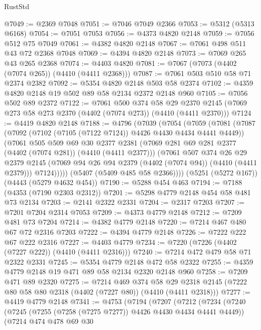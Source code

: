 \begin{lexlean}{RustStd}
\begin{coremodule}
@7049 := @2369 @7048
@7051 := @7046 @7049 @2366
@7053 := @5312 (@5313 @6168)
@7054 := @7051 @7053
@7056 := @4373 @4820 @2148
@7059 := @7056 @512 @75 @7049
@7061 := @4382 @4820 @2148
@7067 := @7061 @498 @511 @43 @72 @2368 @7048
@7069 := @4394 @4820 @2148
@7073 := @7069 @265 @43 @265 @2368
@7074 := @4403 @4820
@7081 := @7067 (@7073 (@4402 (@7074 @265)) (@4410 (@4411 @2368)))
@7087 := @7061 @503 @510 @58 @71 @2374 @2382
@7092 := @5354 @4820 @2148 @503 @58 @2374
@7102 := @4359 @4820 @2148 @19 @502 @89 @58 @2134 @2372 @2148 @960
@7105 := @7056 @502 @89 @2372
@7122 := @7061
    @500
    @374
    @58
    @29
    @2370
    @2145
    (@7069 @273 @58 @273 @2370 (@4402 (@7074 @273)) (@4410 (@4411 @2370)))
@7124 := @4419 @4820 @2148
@7188 := @4796
    (@7039
      (@7054
        (@7059
          (@7081
            (@7087
              (@7092 (@7102 (@7105 (@7122 @7124)) @4426 @4430 @4434 @4441 @4449))
              (@7061
                @505
                @509
                @69
                @30
                @2377
                @2381
                (@7069 @281 @69 @281 @2377 (@4402 (@7074 @281)) (@4410 (@4411 @2377)))
                (@7061
                  @507
                  @374
                  @26
                  @29
                  @2379
                  @2145
                  (@7069 @94 @26 @94 @2379 (@4402 (@7074 @94)) (@4410 (@4411 @2379)))
                  @7124)))))
        (@5407 (@5409 @485 @58 @2366))))
    (@5251 (@5272 @167))
    (@4443 (@5279 @4632 @454))
@7190 := @5288 @454 @463
@7194 := @7188 (@4353 (@7190 @2303 @2312))
@7201 := @5298 @4779 @2148 @454 @58 @481 @73 @2134
@7203 := @2141 @2322 @2331
@7204 := @2317 @7203
@7207 := @7201 @7204 @2314 @7053
@7209 := @4373 @4779 @2148
@7212 := @7209 @481 @73 @7204
@7214 := @4382 @4779 @2148
@7220 := @7214 @467 @480 @67 @72 @2316 @7203
@7222 := @4394 @4779 @2148
@7226 := @7222 @222 @67 @222 @2316
@7227 := @4403 @4779
@7234 := @7220 (@7226 (@4402 (@7227 @222)) (@4410 (@4411 @2316)))
@7240 := @7214 @472 @479 @58 @71 @2322 @2331
@7245 := @5354 @4779 @2148 @472 @58 @2322
@7255 := @4359 @4779 @2148 @19 @471 @89 @58 @2134 @2320 @2148 @960
@7258 := @7209 @471 @89 @2320
@7275 := @7214
    @469
    @374
    @58
    @29
    @2318
    @2145
    (@7222 @80 @58 @80 @2318 (@4402 (@7227 @80)) (@4410 (@4411 @2318)))
@7277 := @4419 @4779 @2148
@7341 := @4753
    (@7194
      (@7207
        (@7212
          (@7234
            (@7240
              (@7245 (@7255 (@7258 (@7275 @7277)) @4426 @4430 @4434 @4441 @4449))
              (@7214
                @474
                @478
                @69
                @30

\end{coremodule}
\end{lexlean}
